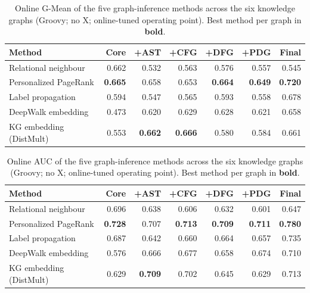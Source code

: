 \begin{table}[H]
\centering \small
\caption{Online G-Mean of the five graph-inference methods across the six knowledge graphs (Groovy; no X; online-tuned operating point). Best method per graph in \textbf{bold}.}
\label{tab:v4-final-g_mean}
\begin{tabular}{lrrrrrr}
\toprule
Method & Core & +AST & +CFG & +DFG & +PDG & Final \\
\midrule
Relational neighbour & 0.662 & 0.532 & 0.563 & 0.576 & 0.557 & 0.545 \\
Personalized PageRank & \textbf{0.665} & 0.658 & 0.653 & \textbf{0.664} & \textbf{0.649} & \textbf{0.720} \\
Label propagation & 0.594 & 0.547 & 0.565 & 0.593 & 0.558 & 0.678 \\
DeepWalk embedding & 0.473 & 0.620 & 0.629 & 0.628 & 0.621 & 0.658 \\
KG embedding (DistMult) & 0.553 & \textbf{0.662} & \textbf{0.666} & 0.580 & 0.584 & 0.661 \\
\bottomrule
\end{tabular}
\end{table}

\begin{table}[H]
\centering \small
\caption{Online AUC of the five graph-inference methods across the six knowledge graphs (Groovy; no X; online-tuned operating point). Best method per graph in \textbf{bold}.}
\label{tab:v4-final-auc}
\begin{tabular}{lrrrrrr}
\toprule
Method & Core & +AST & +CFG & +DFG & +PDG & Final \\
\midrule
Relational neighbour & 0.696 & 0.638 & 0.606 & 0.632 & 0.601 & 0.647 \\
Personalized PageRank & \textbf{0.728} & 0.707 & \textbf{0.713} & \textbf{0.709} & \textbf{0.711} & \textbf{0.780} \\
Label propagation & 0.687 & 0.642 & 0.660 & 0.664 & 0.657 & 0.735 \\
DeepWalk embedding & 0.576 & 0.666 & 0.677 & 0.658 & 0.674 & 0.710 \\
KG embedding (DistMult) & 0.629 & \textbf{0.709} & 0.702 & 0.645 & 0.629 & 0.713 \\
\bottomrule
\end{tabular}
\end{table}

